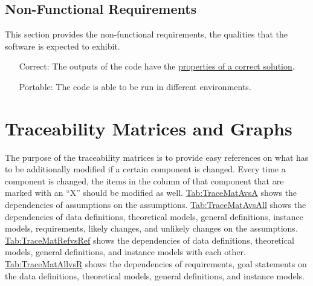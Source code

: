 \documentclass[12pt]{article}
\begin{document}
\subsection{Non-Functional Requirements}
\label{Sec:NFRs}
This section provides the non-functional requirements, the qualities that the software is expected to exhibit.

\begin{itemize}
\item[Correct:\phantomsection\label{correct}]{The outputs of the code have the \hyperref[Sec:CorSolProps]{properties of a correct solution}.}
\item[Portable:\phantomsection\label{portable}]{The code is able to be run in different environments.}
\end{itemize}
\section{Traceability Matrices and Graphs}
\label{Sec:TraceMatrices}
The purpose of the traceability matrices is to provide easy references on what has to be additionally modified if a certain component is changed. Every time a component is changed, the items in the column of that component that are marked with an ``X'' should be modified as well. \hyperref[Table:TraceMatAvsA]{Tab:TraceMatAvsA} shows the dependencies of assumptions on the assumptions. \hyperref[Table:TraceMatAvsAll]{Tab:TraceMatAvsAll} shows the dependencies of data definitions, theoretical models, general definitions, instance models, requirements, likely changes, and unlikely changes on the assumptions. \hyperref[Table:TraceMatRefvsRef]{Tab:TraceMatRefvsRef} shows the dependencies of data definitions, theoretical models, general definitions, and instance models with each other. \hyperref[Table:TraceMatAllvsR]{Tab:TraceMatAllvsR} shows the dependencies of requirements, goal statements on the data definitions, theoretical models, general definitions, and instance models.
\end{document}
